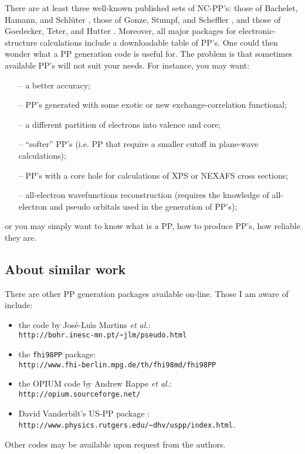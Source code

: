 There are at least three well-known published sets of NC-PP's:
those of Bachelet, Hamann, and Schl\"uter \cite{BHS},
those of Gonze, Stumpf, and Scheffler \cite{Gonze}, and
those of Goedecker, Teter, and Hutter \cite{Goedecker}. 
Moreover, all major packages for electronic-structure calculations
include a downloadable table of PP's. One could then wonder 
what a PP generation code is useful for. The problem is that 
sometimes available PP's will not suit your needs. For instance,
you may want:
\begin{enumerate}
 \item[--] a better accuracy;
 \item[--] PP's generated with some exotic or new exchange-correlation
     functional;
 \item[--] a different partition of electrons into valence and core;
 \item[--] ``softer'' PP's (i.e. PP that require a smaller cutoff
           in plane-wave calculations);
 \item[--] PP's with a core hole for calculations of XPS or NEXAFS
           cross sections;
 \item[--] all-electron wavefunctions reconstruction (requires the
           knowledge of all-electron and pseudo orbitals used in
           the generation of PP's);
\end{enumerate}
or you may simply want to know what is a PP, how to produce PP's, 
how reliable they are.

\subsection{About similar work}

There are other PP generation packages available on-line.
Those I am aware of include:
\begin{itemize}
\item the code by Jos\'e-Lu{\'\i}s Martins {\em et al.}\cite{TM}:\\
{\tt http://bohr.inesc-mn.pt/\~{}jlm/pseudo.html}
\item the {\tt fhi98PP} package\cite{fhi98PP}:\\
{\tt http://www.fhi-berlin.mpg.de/th/fhi98md/fhi98PP}
\item the OPIUM code by Andrew Rappe {\em et al.}\cite{RRKJ}:\\
{\tt http://opium.sourceforge.net/}
\item David Vanderbilt's US-PP package \cite{van}:\\
{\tt http://www.physics.rutgers.edu/\~{}dhv/uspp/index.html}.
\end{itemize}
Other codes may be available upon request from the authors.

